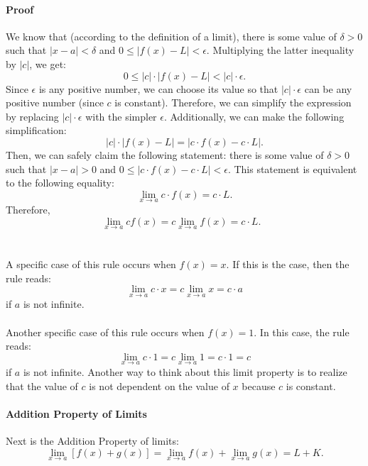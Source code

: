 \documentclass{article}
\begin{document}
\paragraph{Proof} We know that (according to the definition of a limit), there is some value of $\delta>0$ such that $\left|x-a\right|<\delta$ and $0\leq\left|f(x)-L\right|<\epsilon$. Multiplying the latter inequality by $|c|$, we get:
\[0\leq|c|\cdot \left|f(x)-L\right|<|c|\cdot \epsilon.\]
Since $\epsilon$ is any positive number, we can choose its value so that $|c|\cdot \epsilon$ can be any positive number (since $c$ is constant). Therefore, we can simplify the expression by replacing $|c|\cdot \epsilon$ with the simpler $\epsilon$. Additionally, we can make the following simplification:
\[|c|\cdot \left|f(x)-L\right|= \left|c\cdot f(x)-c\cdot L\right|.\]
Then, we can safely claim the following statement: there is some value of $\delta>0$ such that $|x-a|>0$ and $0\leq\left|c\cdot f(x)-c\cdot L\right|<\epsilon$. This statement is equivalent to the following equality:
\[\lim_{x\to a} c\cdot f(x)=c\cdot L.\]
Therefore,
\[\lim_{x\to a} cf(x) = c\lim_{x\to a}f(x)=c\cdot L.\text{ }\boxed{}\]
\\
\\
A specific case of this rule occurs when $f(x)=x$. If this is the case, then the rule reads:
\[\lim_{x\to a} c\cdot x = c\lim_{x\to a}x=c\cdot a\]
if $a$ is not infinite.
\\
\\
Another specific case of this rule occurs when $f(x)=1$. In this case, the rule reads:
\[\lim_{x\to a} c\cdot 1 = c\lim_{x\to a}1=c\cdot 1 = c\]
if $a$ is not infinite. Another way to think about this limit property is to realize that the value of $c$ is not dependent on the value of $x$ because $c$ is constant. 
\paragraph{Addition Property of Limits} Next is the Addition Property of limits:
\[\lim_{x\to a}[f(x)+g(x)]=\lim_{x\to a}f(x) + \lim_{x\to a}g(x)=L+K.\]
\end{document}
